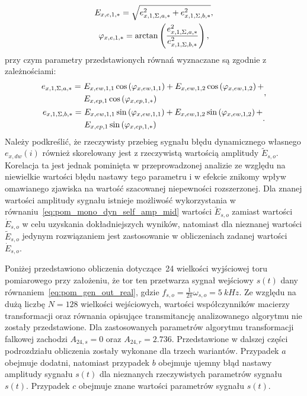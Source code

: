 \begin{gather}
E_{x,e,1,*} = \sqrt{e_{x,1,\Sigma,a,*}^{2} + e_{x,1,\Sigma,b,*}^{2}} \label{eq:pom_mono_dyn_sum_param_amp_mid}, \\
\varphi_{x,e,1,*} = \arctan \left(\frac{e_{x,1,\Sigma,a,*}^{2}}{e_{x,1,\Sigma,b,*}^{2}}\right) \label{eq:pom_mono_dyn_sum_param_phi_mid},
\end{gather}
przy czym parametry przedstawionych równań wyznaczane są zgodnie z zależnościami:
\begin{gather}
\begin{split}
e_{x,1,\Sigma,a,*} =~ & E_{x,ew,1,1} \cos \left(\varphi_{x,ew,1,1}\right) + E_{x,ew,1,2} \cos \left(\varphi_{x,ew,1,2}\right) + \\ & E_{x,ep,1} \cos \left(\varphi_{x,ep,1,*}\right)
\end{split}
\label{eq:pom_mono_dyn_sum_param_a_mid}, \\
\begin{split}
e_{x,1,\Sigma,b,*} =~ & E_{x,ew,1,1} \sin \left(\varphi_{x,ew,1,1}\right) + E_{x,ew,1,2} \sin \left(\varphi_{x,ew,1,2}\right) + \\ & E_{x,ep,1} \sin \left(\varphi_{x,ep,1,*}\right)
\end{split}
\label{eq:pom_mono_dyn_sum_param_b_mid}.
\end{gather}
Należy podkreślić, że rzeczywisty przebieg sygnału błędu dynamicznego własnego $e_{x,dw}(i)$ również skorelowany jest z rzeczywistą wartością amplitudy $\tilde{E}_{s,o}$. Korelacja ta jest jednak pominięta w przeprowadzonej analizie ze względu na niewielkie wartości błędu nastawy tego parametru i w efekcie znikomy wpływ omawianego zjawiska na wartość szacowanej niepewności rozszerzonej. Dla znanej wartości amplitudy sygnału istnieje możliwość wykorzystania w równaniu~\eqref{eq:pom_mono_dyn_self_amp_mid} wartości $\tilde{E}_{s,o}$ zamiast wartości $\dot{E}_{s,o}$ w celu uzyskania dokładniejszych wyników, natomiast dla nieznanej wartości $\tilde{E}_{s,o}$ jedynym rozwiązaniem jest zastosowanie w obliczeniach zadanej wartości $\dot{E}_{s,o}$.

Poniżej przedstawiono obliczenia dotyczące~\qty{24}{\numTej} wielkości wyjściowej toru pomiarowego przy założeniu, że tor ten przetwarza sygnał wejściowy $s(t)$ dany równaniem~\eqref{eq:pom_gen_out_real}, gdzie $f_{s,o} = \frac{1}{2\pi} \omega_{s,o} = \qty{5}{kHz}$. Ze względu na dużą liczbę $N = 128$ wielkości wejściowych, wartości współczynników macierzy transformacji oraz równania opisujące transmitancję analizowanego algorytmu nie zostały przedstawione. Dla zastosowanych parametrów algorytmu transformacji falkowej zachodzi $A_{24,s} = 0$ oraz $A_{24,r} = \num{2.736}$. Przedstawione w dalszej części podrozdziału obliczenia zostały wykonane dla trzech wariantów. Przypadek $a$ obejmuje dodatni, natomiast przypadek $b$ obejmuje ujemny błąd nastawy amplitudy sygnału $s(t)$ dla nieznanych rzeczywistych parametrów sygnału $s(t)$. Przypadek $c$ obejmuje znane wartości parametrów sygnału $s(t)$.

